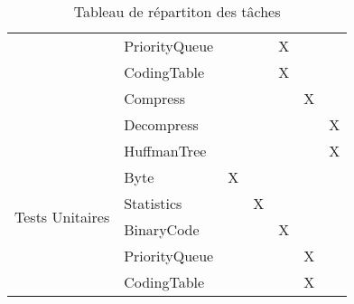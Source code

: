 \documentclass[12pt]{article}
\begin{document}
\begin{table}[]
{\begin{tabular}{|l|l|l|l|l|l|l|}
 & PriorityQueue &  &  & X &  &  \\ \cline{2-7} 
 & CodingTable &  &  & X &  &  \\ \cline{2-7} 
 & Compress &  &  &  & X &  \\ \cline{2-7} 
 & Decompress &  &  &  &  & X \\ \hline
\multirow{8}{*}{Tests Unitaires} & HuffmanTree &  &  &  &  & X \\ \cline{2-7} 
 & Byte & X &  &  &  &  \\ \cline{2-7} 
 & Statistics &  & X &  &  &  \\ \cline{2-7} 
 & BinaryCode &  &  & X &  &  \\ \cline{2-7} 
 & PriorityQueue &  &  &  & X &  \\ \cline{2-7} 
 & CodingTable &  &  &  & X &  \\ \hline
\end{tabular}%
}
\caption{Tableau de répartiton des tâches}
\label{tab:my-table}
\end{table}
\end{document}

